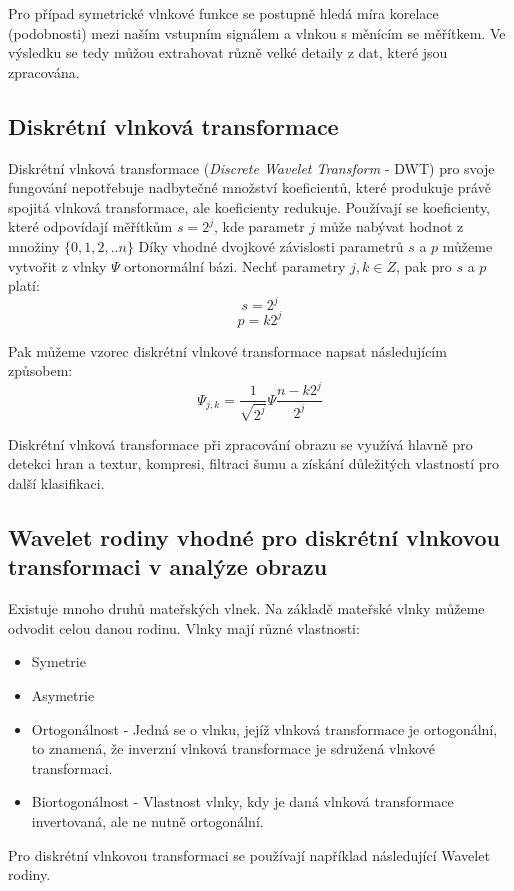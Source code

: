 Pro případ symetrické vlnkové funkce se postupně hledá míra korelace (podobnosti) mezi naším vstupním signálem a vlnkou s měnícím se měřítkem. Ve výsledku se tedy můžou extrahovat různě velké detaily z dat, které jsou zpracována. \cite{WaveletElektrorevue}

\subsection{Diskrétní vlnková transformace}
Diskrétní vlnková transformace (\textit{Discrete Wavelet Transform} - DWT) pro svoje fungování nepotřebuje nadbytečné množství koeficientů, které produkuje právě spojitá vlnková transformace, ale koeficienty redukuje. Používají se koeficienty, které odpovídají měřítkům $s = 2^j$, kde parametr $j$ může nabývat hodnot z množiny $\{0,1,2,..n\}$ Díky vhodné dvojkové závislosti parametrů $s$ a $p$ můžeme vytvořit z vlnky $\Psi$ ortonormální bázi. Nechť parametry $j, k \in Z$, pak pro $s$ a $p$ platí:
$$s = 2^j$$
$$p = k2^j$$

Pak můžeme vzorec diskrétní vlnkové transformace napsat následujícím způsobem:
$$\Psi_{j,k} = \frac{1}{\sqrt{2^j}}\Psi\frac{n-k2^j}{2^j}$$

Diskrétní vlnková transformace při zpracování obrazu se využívá hlavně pro detekci hran a textur, kompresi, filtraci šumu a získání důležitých vlastností pro další klasifikaci. \cite{WaveletElektrorevue}

\subsection{Wavelet rodiny vhodné pro diskrétní vlnkovou transformaci v analýze obrazu}
Existuje mnoho druhů mateřských vlnek. Na základě mateřské vlnky můžeme odvodit celou danou rodinu. Vlnky mají různé vlastnosti: \cite{PyWaveletsBrowser}
\begin{itemize}
    \item Symetrie
    \item Asymetrie
    \item Ortogonálnost - Jedná se o vlnku, jejíž vlnková transformace je ortogonální, to znamená, že inverzní vlnková transformace je sdružená vlnkové transformaci. \cite{WaveletBasics} 
    \item Biortogonálnost - Vlastnost vlnky, kdy je daná vlnková transformace invertovaná, ale ne nutně ortogonální. 
\end{itemize}

Pro diskrétní vlnkovou transformaci se používají například následující Wavelet rodiny.

